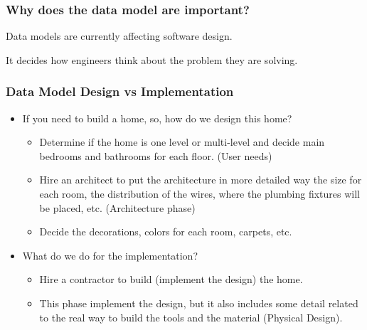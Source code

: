 
\begin{frame}
    \frametitle{Why does the data model are important?}
    \begin{wideitemize}
        \item Data models are currently affecting software design.
        \item It decides how engineers think about the problem they are solving.
    \end{wideitemize}
\end{frame}

\begin{frame}
    \frametitle{Data Model Design vs Implementation}
    \begin{itemize}[<+->]
        \item If you need to build a home, so, how do we design this home?
        \begin{itemize}[<+->]
            \item Determine if the home is one level or multi-level and decide main bedrooms and bathrooms for each floor. (User needs)
            \item Hire an architect to put the architecture in more detailed way \forexample the size for each room, the distribution of the wires, where the plumbing fixtures will be placed, etc. (Architecture phase)
            \item Decide the decorations, colors for each room, carpets, etc.
        \end{itemize}
        \item What do we do for the implementation?
        \begin{itemize}[<+->]
            \item Hire a contractor to build (implement the design) the home.
            \item This phase implement the design, but it also includes some detail related to the real way to build the tools and the material (Physical Design).
        \end{itemize}
    \end{itemize}
\end{frame}

